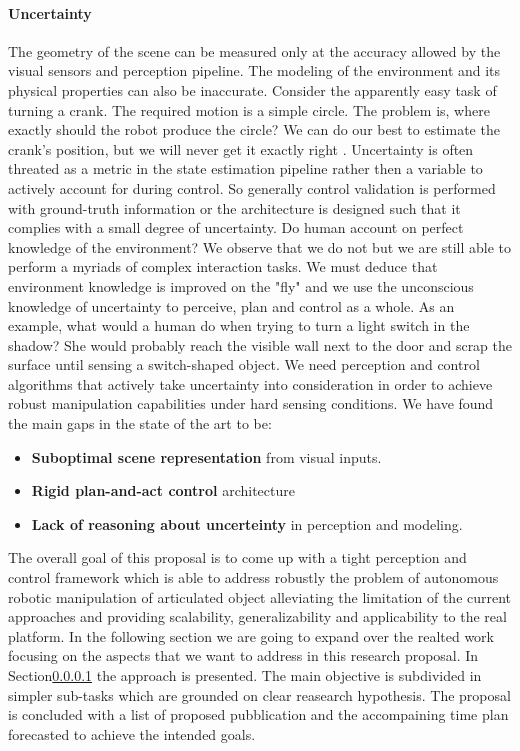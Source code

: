 \paragraph{Uncertainty} The geometry of the scene can be measured only at the accuracy allowed by the visual sensors and perception pipeline. The modeling of the environment and its physical properties can also be inaccurate. Consider the apparently easy task of turning a crank. The required motion is a simple circle. The problem is, where exactly should the robot produce the circle? We can do our best to estimate the crank’s position, but we will never get it exactly right \citep{mason2018toward}. Uncertainty is often threated as a metric in the state estimation pipeline rather then a variable to actively account for during control. So generally control validation is performed with ground-truth information or the architecture is designed such that it complies with a small degree of uncertainty. Do human account on perfect knowledge of the environment? We observe that we do not but we are still able to perform a myriads of complex interaction tasks. We must deduce that environment knowledge is improved on the "fly" and we use the unconscious knowledge of uncertainty to perceive, plan and control as a whole. As an example, what would a human do when trying to turn a light switch in the shadow? She would probably reach the visible wall next to the door and scrap the surface until sensing a switch-shaped object. We need perception and control algorithms that actively take uncertainty into consideration in order to achieve robust manipulation capabilities under hard sensing conditions.   
\medskip 
\newline
We have found the main gaps in the state of the art to be:
\begin{itemize}
\item \textbf{Suboptimal scene representation} from visual inputs.
\item \textbf{Rigid plan-and-act control} architecture
\item \textbf{Lack of reasoning about uncerteinty} in perception and modeling. 
\end{itemize}


The overall goal of this proposal is to come up with a tight perception and control framework which is able to address robustly the problem of autonomous robotic manipulation of articulated object alleviating the limitation of the current approaches and providing scalability, generalizability and applicability to the real platform. In the following section we are going to expand over the realted work focusing on the aspects that we want to address in this research proposal. In Section\ref{} the approach is presented. The main objective is subdivided in simpler sub-tasks which are grounded on clear reasearch hypothesis. The proposal is concluded with a list of proposed pubblication and the accompaining time plan forecasted to achieve the intended goals. 
